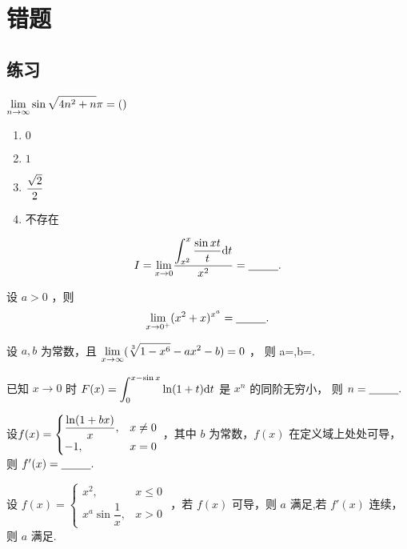 \chapter{错题}
\section{练习}

\begin{Quest}[\goto{E1}]
    $\displaystyle {\displaystyle\lim_{n\rightarrow \infty}}\sin\sqrt{4n^2+n}\pi=() $
    \begin{enumerate}
        \item $ 0 $ 
        \item $ 1 $ 
        \item $ \displaystyle \frac{\sqrt 2}{2} $ 
        \item 不存在
    \end{enumerate}
\end{Quest}

\begin{quest}[660T9]
    $$
        I = {\displaystyle\lim_{x\rightarrow 0}}\dfrac{\displaystyle \int_{x^2}^x\dfrac{\sin xt}{t}\mathrm{d}t}{x^2}
        =\underline{~~~~~~~~}.
    $$ 
\end{quest}

\begin{quest}[660T11]
    设 $ a>0 $ ，则$$
        {\displaystyle\lim_{x\rightarrow 0^+}}(x^2+x)^{x^a} = \underline{~~~~~~~~}.
    $$ 
\end{quest}

\begin{quest}[660T17]
    设 $ a,b $ 为常数，且 $ \displaystyle {\displaystyle\lim_{x\rightarrow \infty}}(\displaystyle\sqrt[3]{1-x^6}-ax^2-b) = 0 $ ，
    则 a=\qline,b=\qline.
\end{quest}

\begin{quest}[660T21]
    已知 $ x\rightarrow0 $ 时 $ \displaystyle F(x) = \int_0^{x-\sin x}\ln(1+t)\mathrm{d}t $ 是 $ x^n $ 的同阶无穷小，
    则 $ n = \underline{~~~~~~~~}. $ 
\end{quest}

\begin{quest}[660T27]
    设$ \displaystyle f(x) = \begin{cases}
        \dfrac{\ln (1+bx)}{x},& x\neq0\\-1,& x = 0
    \end{cases} $ ，其中 $ b $ 为常数，$ f(x) $ 在定义域上处处可导，则 $ f'(x) = \underline{~~~~~~~~}. $ 
\end{quest}

\begin{quest}[660T28]
    设 $ f(x) = \begin{cases}
        x^2,&x\leq 0\\ 
        x^a\sin \dfrac{1}{x},& x > 0
    \end{cases} $ ，若 $ f(x) $ 可导，则 $ a $ 满足\qline,若 $ f'(x) $ 连续，则 $ a $ 满足\qline.
\end{quest}

